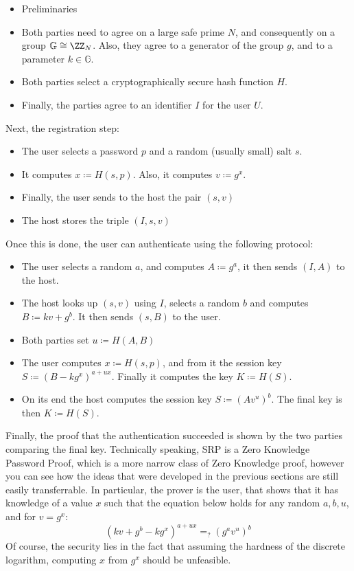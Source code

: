\documentclass{article}
\begin{document}
\begin{itemize}
    \item Preliminaries
    \item Both parties need to agree on a large safe prime $N$, and consequently on a group $\mathbb{G} \cong \ZZ_N$.
          Also, they agree to a generator of the group $g$, and to a parameter $k \in \mathbb{G}$.
    \item Both parties select a cryptographically secure hash function $H$.
    \item Finally, the parties agree to an identifier $I$ for the user $U$.
\end{itemize}
Next, the registration step:
\begin{itemize}
    \item The user selects a password $p$ and a random (usually small) salt $s$.
    \item It computes $x \coloneqq H(s, p)$. Also, it computes $v \coloneqq g^x$.
    \item Finally, the user sends to the host the pair $(s, v)$
    \item The host stores the triple $(I, s, v)$
\end{itemize}
Once this is done, the user can authenticate using the following protocol:
\begin{itemize}
    \item The user selects a random $a$, and computes $A \coloneqq g^a$, it then sends $(I, A)$ to the host.
    \item The host looks up $(s,v)$ using $I$, selects a random $b$ and computes $B \coloneqq kv + g^b$. It then sends $(s, B)$ to the user.
    \item Both parties set $u \coloneqq H(A, B)$
    \item The user computes $x \coloneqq H(s, p)$, and from it the session key $S \coloneqq (B - kg^x)^{a + ux}$. Finally it computes the key
          $K \coloneqq H(S)$.
    \item On its end the host computes the session key $S \coloneqq (Av^u)^b$. The final key is then $K \coloneqq H(S)$.
\end{itemize}
Finally, the proof that the authentication succeeded is shown by the two parties comparing the final key.
Technically speaking, SRP is a Zero Knowledge Password Proof, which is a more narrow class of Zero Knowledge proof,
however you can see how the ideas that were developed in the previous sections are still easily transferrable.
In particular, the prover is the user, that shows that it has knowledge of a value $x$ such that the equation
below holds for any random $a, b, u$, and for $v = g^x$:
\[ (kv + g^b - kg^x)^{a + ux} =_? (g^a v^u)^b \]
Of course, the security lies in the fact that assuming the hardness of the discrete logarithm, computing
$x$ from $g^x$ should be unfeasible.
\end{document}
